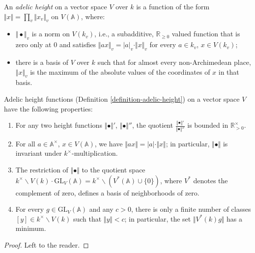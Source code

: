 \begin{definition}
 \label{definition-adelic-height}
An \emph{adelic height} on a vector space $V$ over $k$ is a function of the form $\Vert x\Vert = \prod_v \Vert x_v \Vert_v$ on $V(\mathbb A)$, where:
\begin{itemize}
 \item $\Vert \bullet \Vert_v$ is a norm on $V(k_v)$, i.e., a subadditive, $\mathbb R_{\ge 0}$ valued function that is zero only at $0$ and satisfies $\Vert a x \Vert_v = |a|_v \cdot \Vert x \Vert_v$ for every $a\in k_v$, $x\in V(k_v)$;
 \item there is a basis of $V$ over $k$ such that for almost every non-Archimedean place, $\Vert x\Vert_v$ is the maximum of the absolute values of the coordinates of $x$ in that basis.
\end{itemize}
\end{definition}

\begin{lemma}
 \label{lemma-height-functions}
Adelic height functions (Definition \ref{definition-adelic-height}) on a vector space $V$ have the following properties:
\begin{enumerate}
 \item For any two height functions $\Vert \bullet \Vert'$, $\Vert\bullet\Vert''$, the quotient $\frac{\Vert\bullet\Vert'}{\Vert\bullet\Vert''}$ is bounded in $\mathbb R_{>0}^\times$.
 \item For all $a\in \mathbb A^\times$, $x\in V(\mathbb A)$, we have $\Vert a x \Vert = |a|\cdot \Vert x \Vert$; in particular, $\Vert \bullet \Vert$ is invariant under $k^\times$-multiplication.
 \item The restriction of $\Vert\bullet\Vert$ to the quotient space $k^\times \backslash V(k)\cdot \text{GL}_V(\mathbb A) = k^\times\backslash (V^*(\mathbb A)\cup \{0\})$, where $V^*$ denotes the complement of zero, defines a basis of neighborhoods of zero.
 \item For every $g\in \text{GL}_V(\mathbb A)$ and any $c>0$, there is only a finite number of classes $[y]\in k^\times \backslash V(k)$ such that $\Vert y\Vert <c$; in particular, the set $\Vert V^*(k)g\Vert$ has a minimum.
\end{enumerate}

\end{lemma}

\begin{proof}
 Left to the reader.
\end{proof}


